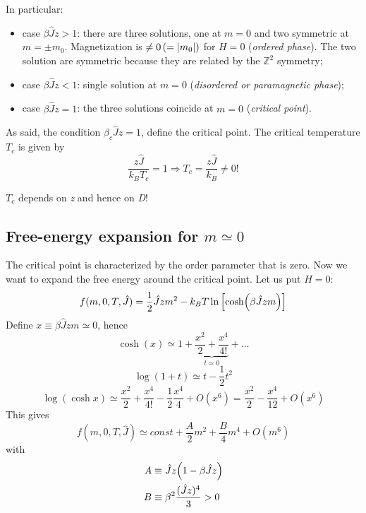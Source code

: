 \documentclass[../main/main.tex]{subfiles}
\begin{document}
In particular:
\begin{itemize}
\item case \( \beta \hat{J} z > 1  \): there are three solutions, one at \( m=0 \) and two symmetric at \( m=\pm m_0 \). Magnetization is \( \neq 0 \, (= \abs{m_0} )\) for \( H=0 \) (\emph{ordered phase}).  The two solution are symmetric because they are related by the \( \mathbb{Z}^2 \)  symmetry;
\item case \( \beta \hat{J} z < 1  \): single solution at \( m=0 \) (\emph{disordered or paramagnetic phase});
\item case \( \beta \hat{J} z = 1  \): the three solutions coincide at \( m=0 \) (\emph{critical point}).
\end{itemize}
As said, the condition \( \beta_c \hat{J} z = 1  \), define the critical point. The critical temperature \( T_c \) is given by
\begin{equation}
  \frac{z \hat{J} }{k_B T_c} = 1 \Rightarrow T_c = \frac{z \hat{J} }{k_B} \neq 0!
\end{equation}
\begin{remark}
\( T_c \) depends on \emph{z} and hence on \emph{D}!
\end{remark}

\subsection{Free-energy expansion for \( m \simeq 0 \)}
The critical point is characterized by the order parameter that is zero. Now we want to expand the free energy around the critical point. Let us put \( H=0 \):
\begin{equation}
  f(m,0,T,\hat{J} ) = \frac{1}{2}\hat{J}zm^2 -k_BT \ln{\qty[\cosh(\beta \hat{J}zm )]}
\end{equation}
Define \( x \equiv \beta \hat{J} z m \simeq 0  \), hence
\begin{equation}
  \cosh (x) \simeq 1 + \underbrace{\frac{x^2}{2} + \frac{x^4}{4!}}_{t \simeq 0}  + \dots
\end{equation}
\begin{equation}
  \log{(1+t)} \simeq t - \frac{1}{2}t^2
\end{equation}
\begin{equation}
  \log{(\cosh x)} \simeq \frac{x^2}{2} + \frac{x^4}{4!} - \frac{1}{2} \frac{x^4}{4}+O(x^6)
  = \frac{x^2}{2} - \frac{x^4}{12}+O(x^6)
\end{equation}
This gives
\begin{equation}
  f(m,0,T,\hat{J} ) \simeq  const + \frac{A}{2} m^2 + \frac{B}{4} m^4 + O (m^6)
\end{equation}
with
\begin{subequations}
\begin{align}
   A & \equiv  \hat{J} z \qty(1- \beta \hat{J} z) \\
    B & \equiv  \beta ^2 \frac{(\hat{J}z )^4}{3} > 0
\end{align}
\end{subequations}
\end{document}
